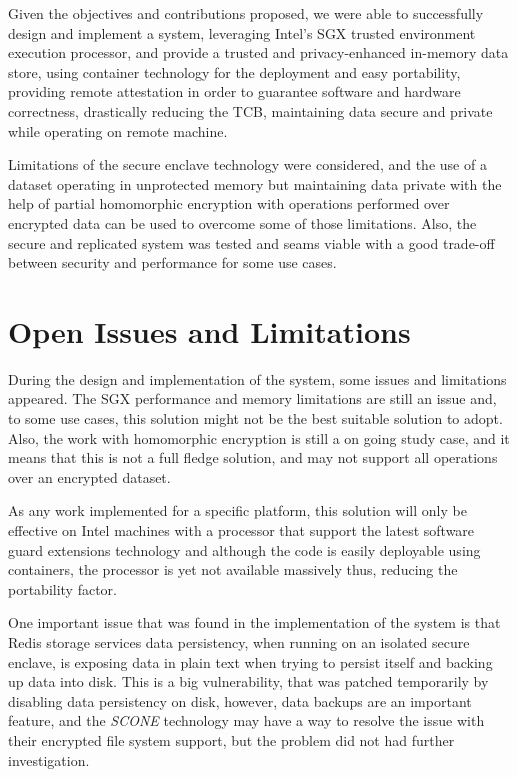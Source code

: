 Given the objectives and contributions proposed, we were able to successfully design and implement a system, leveraging Intel's \gls{SGX} trusted environment execution processor, and provide a trusted and privacy-enhanced in-memory data store, using container technology for the deployment and easy portability, providing remote attestation in order to guarantee software and hardware correctness, drastically reducing the \gls{TCB}, maintaining data secure and private while operating on remote machine.

Limitations of the secure enclave technology were considered, and the use of a dataset operating in unprotected memory but maintaining data private with the help of partial homomorphic encryption with operations performed over encrypted data can be used to overcome some of those limitations. Also, the secure and replicated system was tested and seams viable with a good trade-off between security and performance for some use cases.

\section{Open Issues and Limitations}
\label{sec:open_issues_and_limitations}

During the design and implementation of the system, some issues and limitations appeared. The \gls{SGX} performance and memory limitations are still an issue and, to some use cases, this solution might not be the best suitable solution to adopt. Also, the work with homomorphic encryption is still a on going study case, and it means that this is not a full fledge solution, and may not support all operations over an encrypted dataset.

As any work implemented for a specific platform, this solution will only be effective on Intel machines with a processor that support the latest software guard extensions technology and although the code is easily deployable using containers, the processor is yet not available massively thus, reducing the portability factor. 

One important issue that was found in the implementation of the system is that Redis storage services data persistency, when running on an isolated secure enclave, is exposing data in plain text when trying to persist itself and backing up data into disk. This is a big vulnerability, that was patched temporarily by disabling data persistency on disk, however, data backups are an important feature, and the \textit{SCONE} technology may have a way to resolve the issue with their encrypted file system support, but the problem did not had further investigation.

